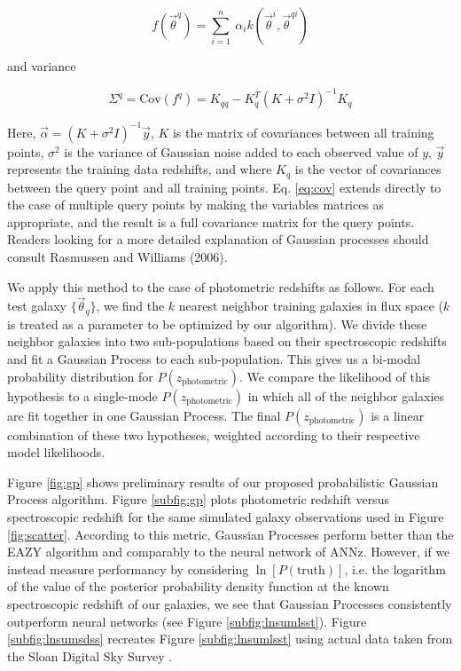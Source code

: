 \documentclass[useAMS,usenatbib,tightenlines,11pt,preprint]{aastex}
\begin{document}
\begin{equation}
f(\vec{\theta}^{q}) = \sum_{i=1}^n \
\alpha_i k(\vec{\theta}^{i},\vec{\theta}^{qi})
\label{eq:mean}
\end{equation}

\noindent
and variance

\begin{equation}
\Sigma^{q} = \text{Cov}(f^{q}) = K_{qq} - K_q^T (K + \sigma^2I)^{-1} K_q
\label{eq:cov}
\end{equation}

\noindent
Here, $\vec{\alpha} = (K + \sigma^2 I)^{-1}\vec{y}$, $K$ is the matrix of
covariances between all training points, $\sigma^2$ is the variance of
Gaussian noise added to each observed value of $y$, $\vec{y}$
represents the training data redshifts, and
where $K_q$ is the vector of covariances between the query point and all
training points.  Eq. \ref{eq:cov} extends directly to the case of multiple
query points by making the variables matrices as appropriate, and the
result is a full covariance matrix for the query points.  Readers looking
for a more detailed explanation of Gaussian processes should consult
Rasmussen and Williams (2006).

We apply this method to the case of photometric redshifts as follows.  For each
test galaxy $\{\vec{\theta}_q\}$, we find the $k$ nearest neighbor training
galaxies in flux space ($k$ is treated as a parameter to be optimized by our
algorithm).  We divide these neighbor galaxies into two sub-populations based on
their spectroscopic redshifts and fit a Gaussian Process to each sub-population.
This gives us a bi-modal probability distribution for $P(z_\text{photometric})$. 
We compare the likelihood of this hypothesis to a single-mode
$P(z_\text{photometric})$ in which all of the neighbor galaxies are fit together
in one Gaussian Process.  The final $P(z_\text{photometric})$ is a linear
combination of these two hypotheses, weighted according to their respective
model likelihoods.

Figure \ref{fig:gp} shows preliminary results of our proposed probabilistic
Gaussian Process algorithm.  Figure \ref{subfig:gp} plots photometric
redshift versus spectroscopic redshift for the same simulated
galaxy observations used in Figure
\ref{fig:scatter}.  
According to this metric,
Gaussian Processes perform better than the EAZY algorithm
and comparably to the neural network of ANNz.  However, if we instead measure
performancy by considering $\ln[P(\text{truth})]$, i.e. the logarithm of the
value of the posterior probability density function at the known spectroscopic
redshift of our galaxies, we see that Gaussian Processes consistently outperform
neural networks (see Figure \ref{subfig:lnsumlsst}).
Figure \ref{subfig:lnsumsdss} recreates Figure \ref{subfig:lnsumlsst} using actual data
taken from the Sloan Digital Sky Survey \cite{Abazajian:2008wr}.
\end{document}
